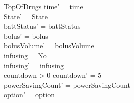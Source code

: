 \begin{schema}{TopOfDrugs}
	time' = time\\ State' = State\\
	battStatus' = battStatus\\
	bolus' = bolus\\
	bolusVolume' = bolusVolume\\
	infusing = No\\
	infusing' = infusing\\
	countdown > 0 \land countdown' = 5\\
	powerSavingCount' = powerSavingCount\\ option' = option\\
\end{schema}

